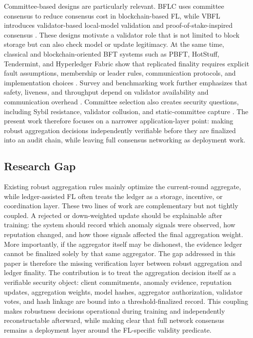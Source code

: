 \documentclass[preprint,12pt]{elsarticle}
\begin{document}
Committee-based designs are particularly relevant. BFLC uses committee consensus to reduce consensus cost in blockchain-based FL, while VBFL introduces validator-based local-model validation and proof-of-stake-inspired consensus \citep{li2020bflc,chen2021vbfl}. These designs motivate a validator role that is not limited to block storage but can also check model or update legitimacy. At the same time, classical and blockchain-oriented BFT systems such as PBFT, HotStuff, Tendermint, and Hyperledger Fabric show that replicated finality requires explicit fault assumptions, membership or leader rules, communication protocols, and implementation choices \citep{castro1999pbft,yin2019hotstuff,buchman2018tendermint,androulaki2018fabric}. Survey and benchmarking work further emphasizes that safety, liveness, and throughput depend on validator availability and communication overhead \citep{zhang2022bftsurvey,alqahtani2021bottlenecks}. Committee selection also creates security questions, including Sybil resistance, validator collusion, and static-committee capture \citep{rajab2020sybil}. The present work therefore focuses on a narrower application-layer point: making robust aggregation decisions independently verifiable before they are finalized into an audit chain, while leaving full consensus networking as deployment work.

\subsection{Research Gap}

Existing robust aggregation rules mainly optimize the current-round aggregate, while ledger-assisted FL often treats the ledger as a storage, incentive, or coordination layer. These two lines of work are complementary but not tightly coupled. A rejected or down-weighted update should be explainable after training: the system should record which anomaly signals were observed, how reputation changed, and how those signals affected the final aggregation weight. More importantly, if the aggregator itself may be dishonest, the evidence ledger cannot be finalized solely by that same aggregator. The gap addressed in this paper is therefore the missing verification layer between robust aggregation and ledger finality. The contribution is to treat the aggregation decision itself as a verifiable security object: client commitments, anomaly evidence, reputation updates, aggregation weights, model hashes, aggregator authorization, validator votes, and hash linkage are bound into a threshold-finalized record. This coupling makes robustness decisions operational during training and independently reconstructable afterward, while making clear that full network consensus remains a deployment layer around the FL-specific validity predicate.
\end{document}

